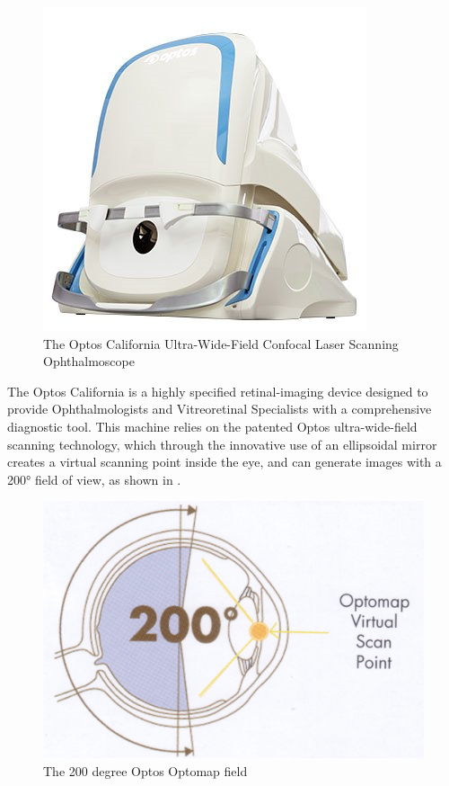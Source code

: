 \begin{figure}[htbp]
\centering
  \includegraphics{figures/california}
\caption{The Optos California Ultra-Wide-Field Confocal Laser Scanning Ophthalmoscope}
\label{fig:cali}
     \end{figure}


The Optos California is a highly specified retinal-imaging device designed to provide Ophthalmologists and Vitreoretinal Specialists with a comprehensive diagnostic tool. This machine relies on the patented Optos ultra-wide-field scanning technology, which through the innovative use of an ellipsoidal mirror creates a virtual scanning point inside the eye, and can generate images with a 200° field of view, as shown in .   

\begin{figure}[htbp]
\centering
  \includegraphics{figures/optoswide}
\caption{The 200 degree Optos Optomap field}
\label{fig:wideview}
     \end{figure}

